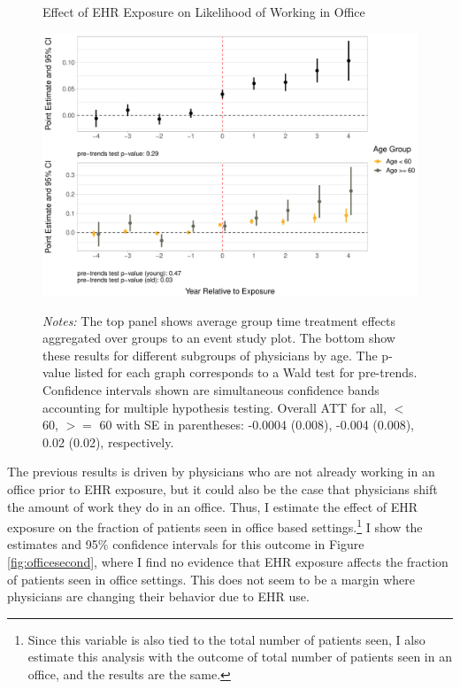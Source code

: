 \documentclass[12pt]{article}
\begin{document}
\begin{figure}[ht]
    \centering
    \captionsetup{width=.85\linewidth}
    \caption{Effect of EHR Exposure on Likelihood of Working in Office}
    \includegraphics[scale=.6]{Objects/officeind_plot.pdf}
    \label{fig:officefirst}
    \vspace{2mm}
    \caption*{\footnotesize{\textit{Notes:} The top panel shows average group time treatment effects aggregated over groups to an event study plot. The bottom show these results for different subgroups of physicians by age. The p-value listed for each graph corresponds to a Wald test for pre-trends. Confidence intervals shown are simultaneous confidence bands accounting for multiple hypothesis testing. Overall ATT for all, $<$ 60, $>=$ 60 with SE in parentheses: -0.0004 (0.008), -0.004 (0.008), 0.02 (0.02), respectively.}}
\end{figure}

The previous results is driven by physicians who are not already working in an office prior to EHR exposure, but it could also be the case that physicians shift the amount of work they do in an office. Thus, I estimate the effect of EHR exposure on the fraction of patients seen in office based settings.\footnote{Since this variable is also tied to the total number of patients seen, I also estimate this analysis with the outcome of total number of patients seen in an office, and the results are the same.} I show the estimates and 95\% confidence intervals for this outcome in Figure \ref{fig:officesecond}, where I find no evidence that EHR exposure affects the fraction of patients seen in office settings. This does not seem to be a margin where physicians are changing their behavior due to EHR use.
\end{document}
